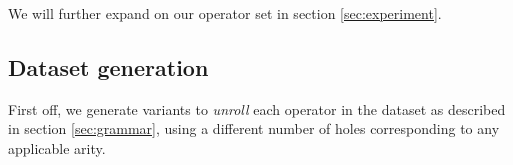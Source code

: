 \documentclass{article}
\begin{document}

We will further expand on our operator set
in section \ref{sec:experiment}.

\subsection{Dataset generation} \label{sec:datagen}



First off, we generate variants to \emph{unroll} each operator in the dataset
as described in section \ref{sec:grammar},
using a different number of holes corresponding to any applicable arity.
\end{document}
